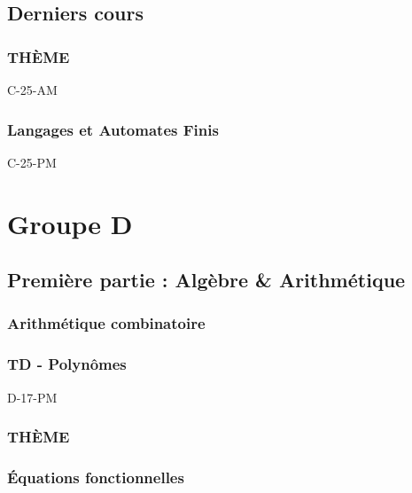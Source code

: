 \documentclass[poly,trombi]{valbonne}
\begin{document}


\section{Derniers cours}


\subsection{THÈME}
{C-25-AM}

\subsection{Langages et Automates Finis}

{C-25-PM}






\chapter{Groupe D}

\minitoc \clearpage

\section{Première partie : Algèbre \& Arithmétique}

\subsection{Arithmétique combinatoire}


\subsection{TD - Polynômes}

{D-17-PM}

\subsection{THÈME}


\subsection{Équations fonctionnelles}
\end{document}
